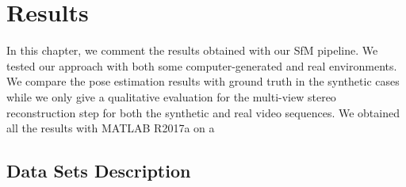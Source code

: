 \chapter{Results}
In this chapter, we comment the results obtained with our SfM pipeline.
We tested our approach with both some computer-generated and real environments.
We compare the pose estimation results with ground truth in the synthetic cases
while we only give a qualitative evaluation for the multi-view stereo
reconstruction step for both the synthetic and real video sequences.
We obtained all the results with MATLAB R2017a on a 

\section{Data Sets Description}
